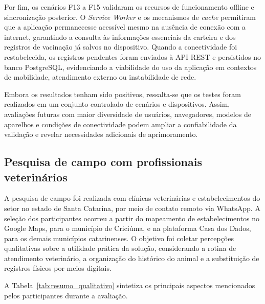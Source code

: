 Por fim, os cenários F13 a F15 validaram os recursos de funcionamento offline e sincronização posterior. O \textit{Service Worker} e os mecanismos de \textit{cache} permitiram que a aplicação permanecesse acessível mesmo na ausência de conexão com a internet, garantindo a consulta às informações essenciais da carteira e dos registros de vacinação já salvos no dispositivo. Quando a conectividade foi restabelecida, os registros pendentes foram enviados à API REST e persistidos no banco PostgreSQL, evidenciando a viabilidade do uso da aplicação em contextos de mobilidade, atendimento externo ou instabilidade de rede.

Embora os resultados tenham sido positivos, ressalta-se que os testes foram realizados em um conjunto controlado de cenários e dispositivos. Assim, avaliações futuras com maior diversidade de usuários, navegadores, modelos de aparelhos e condições de conectividade podem ampliar a confiabilidade da validação e revelar necessidades adicionais de aprimoramento.

\subsection{Pesquisa de campo com profissionais veterinários}

A pesquisa de campo foi realizada com clínicas veterinárias e estabelecimentos do setor no estado de Santa Catarina, por meio de contato remoto via WhatsApp. A seleção dos participantes ocorreu a partir do mapeamento de estabelecimentos no Google Maps, para o município de Criciúma, e na plataforma Casa dos Dados, para os demais municípios catarinenses. O objetivo foi coletar percepções qualitativas sobre a utilidade prática da solução, considerando a rotina de atendimento veterinário, a organização do histórico do animal e a substituição de registros físicos por meios digitais.

A Tabela~\ref{tab:resumo_qualitativo} sintetiza os principais aspectos mencionados pelos participantes durante a avaliação.

